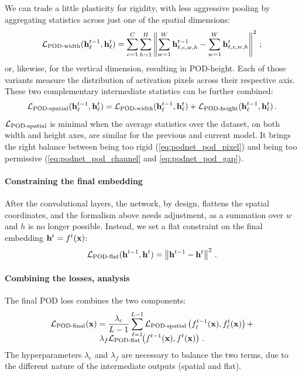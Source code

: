 We can trade a little plasticity for rigidity, with less aggressive pooling by aggregating
statistics across just one of the spatial dimensions:
%
\begin{equation}
    \mathcal{L}_{\text{POD-width}}(\mathbf{h}^{t-1}_\ell, \mathbf{h}^t_\ell)  = \sum_{c=1}^{C} \sum_{h=1}^{H} \left\Vert \sum_{w=1}^W \mathbf{h}^{t-1}_{\ell,c,w,h} - \sum_{w=1}^W \mathbf{h}^{t}_{\ell,c,w,h} \right\Vert^2\,;
    \label{eq:podnet_pod_width}
\end{equation}
%
or, likewise, for the vertical dimension, resulting in POD-height. Each of those variants measure
the distribution of activation pixels across their respective axis. These two complementary
intermediate statistics can be further combined:
%
\begin{equation}
    \mathcal{L}_{\text{POD-spatial}}(\mathbf{h}^{t-1}_\ell, \mathbf{h}^t_\ell) = \mathcal{L}_{\text{POD-width}}(\mathbf{h}^{t-1}_\ell, \mathbf{h}^t_\ell) + \mathcal{L}_{\text{POD-height}}(\mathbf{h}^{t-1}_\ell, \mathbf{h}^t_\ell)\,.
    \label{eq:podnet_pod_spatial}
\end{equation}
%
$\mathcal{L}_{\text{POD-spatial}}$ is minimal when the average statistics over the dataset, on both width
and height axes, are similar for the previous and current model. It brings the right balance between
being too rigid (\autoref{eq:podnet_pod_pixel}) and being too permissive
(\autoref{eq:podnet_pod_channel} and \ref{eq:podnet_pod_gap}).

\label{sec:podnet_pod_flat}
\paragraph{Constraining the final embedding} After the convolutional layers, the network, by design,
flattens the spatial coordinates, and the formalism above needs adjustment, as a summation over $w$
and $h$ is no longer possible. Instead, we set a flat constraint on the final embedding $\mathbf{h}^{t} =
    f^{t}(\mathbf{x})$:
%
\begin{equation}
    \mathcal{L}_{\text{POD-flat}}(\mathbf{h}^{t-1}, \mathbf{h}^t) = \left\Vert \mathbf{h}^{t-1} - \mathbf{h}^t \right\Vert^2\,.
    \label{eq:podnet_pod_flat}
\end{equation}

\paragraph{Combining the losses, analysis} The final POD loss combines the two  components:
%
\begin{multline}
    \mathcal{L}_\text{POD-final}(\mathbf{x}) =  \frac{\lambda_{c}}{L-1}\sum_{\ell=1}^{L-1}  \mathcal{L}_{\text{POD-spatial}}\left(f^{t-1}_\ell(\mathbf{x}), f^t_\ell(\mathbf{x})\right) + \\[-0.8em]
    \lambda_{f} \mathcal{L}_\text{POD-flat}\left(f^{t-1}(\mathbf{x}), f^t(\mathbf{x})\right)\,.
    \label{eq:podnet_pod_final}
\end{multline}
%
The hyperparameters $\lambda_{c}$ and $\lambda_{f}$ are necessary to balance the two terms, due to
the different nature of the intermediate outputs (spatial and flat).

